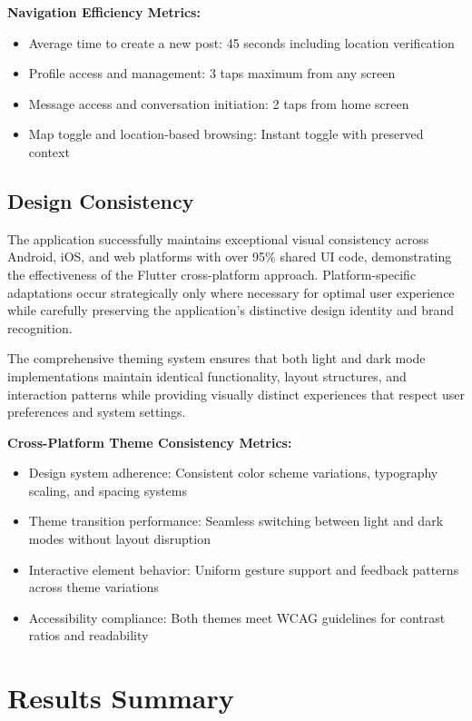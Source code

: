 \textbf{Navigation Efficiency Metrics:}
\begin{itemize}
    \item Average time to create a new post: 45 seconds including location verification
    \item Profile access and management: 3 taps maximum from any screen
    \item Message access and conversation initiation: 2 taps from home screen
    \item Map toggle and location-based browsing: Instant toggle with preserved context
\end{itemize}

\subsection{Design Consistency}\label{subsec:design_consistency}

The application successfully maintains exceptional visual consistency across Android, iOS, and web platforms with over 95\% shared UI code, demonstrating the effectiveness of the Flutter cross-platform approach. Platform-specific adaptations occur strategically only where necessary for optimal user experience while carefully preserving the application's distinctive design identity and brand recognition.

The comprehensive theming system ensures that both light and dark mode implementations maintain identical functionality, layout structures, and interaction patterns while providing visually distinct experiences that respect user preferences and system settings.

\textbf{Cross-Platform Theme Consistency Metrics:}
\begin{itemize}
    \item Design system adherence: Consistent color scheme variations, typography scaling, and spacing systems
    \item Theme transition performance: Seamless switching between light and dark modes without layout disruption
    \item Interactive element behavior: Uniform gesture support and feedback patterns across theme variations
    \item Accessibility compliance: Both themes meet WCAG guidelines for contrast ratios and readability
\end{itemize}

\section{Results Summary}\label{sec:results_summary}

